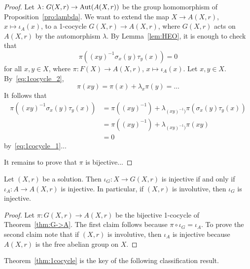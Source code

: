 \begin{proof}
    Let $\lambda\colon G(X,r)\to\operatorname{Aut}(A(X,r))$ be the group homomorphism of Proposition~\ref{pro:lambda}. 
    We want to extend the map $X\to A(X,r)$, $x\mapsto\iota_A(x)$, to a 1-cocycle $G(X,r)\to A(X,r)$, 
    where $G(X,r)$ acts on $A(X,r)$ by the automorphism  
    $\lambda$. By Lemma~\ref{lem:HEO}, it is enough to check that
    \[
        \pi( (xy)^{-1}\sigma_x(y)\tau_y(x)) = 0
    \]
    for all $x,y\in X$, where $\pi\colon F(X)\to A(X,r)$, $x\mapsto\iota_A(x)$. Let $x,y\in X$. By~\eqref{eq:1cocycle_2},
    \[
    \pi(xy)=\pi(x)+\lambda_x\pi(y)=...
    \]
    It follows that 
    \begin{align*}
        \pi( (xy)^{-1}\sigma_x(y)\tau_y(x)) 
        &= \pi( (xy)^{-1})+\lambda_{(xy)^{-1})}\pi(\sigma_x(y)\tau_y(x))\\
        &= \pi( (xy)^{-1})+\lambda_{(xy)^{-1})}\pi(xy)\\
        &= 0
    \end{align*}
    by~\eqref{eq:1cocycle_1}...
    
    It remains to prove that $\pi$ is bijective...
\end{proof}

\begin{corollary}
    Let $(X,r)$ be a solution. Then $\iota_G\colon X\to G(X,r)$ is injective 
    if and only if $\iota_A\colon A\to A(X,r)$ is injective. In particular, 
    if $(X,r)$ is involutive, then $\iota_G$ is injective. 
\end{corollary}

\begin{proof}
    Let $\pi\colon G(X,r)\to A(X,r)$ be the bijective 1-cocycle of 
    Theorem~\ref{thm:G->A}. The first claim follows because 
    $\pi\circ \iota_G=\iota_A$. To prove the second claim note that if $(X,r)$ is involutive, then 
    $\iota_A$ is injective because $A(X,r)$ is the free abelian group on $X$. 
\end{proof}

Theorem~\ref{thm:1cocycle} is the key of the following classification result.

